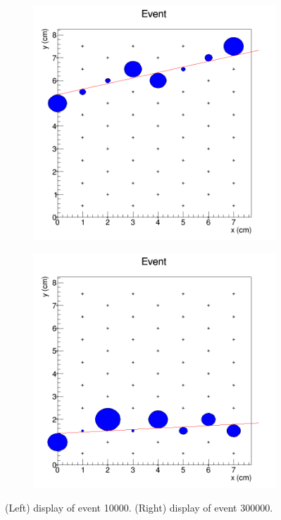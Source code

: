 \documentclass[11pt]{article}
\begin{document}
\begin{figure}
\begin{subfigure}[h]{0.49\linewidth}
    \centering
    \includegraphics[width=1.0\linewidth]{tex/secant-10004.png}
\end{subfigure}
\begin{subfigure}[h]{0.49\linewidth}
    \centering
    \includegraphics[width=1.0\linewidth]{tex/secant-300004.png}
\end{subfigure}
    \caption{(Left) display of event 10000. (Right) display of event 300000.}
\label{fig:ev-display}
\end{figure}
\end{document}
